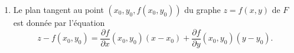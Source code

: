 {\begin{enumerate}
{\begin{enumerate}
\item Le plan tangent au point $(x_0,y_0,f(x_0,y_0))$
du graphe $z=f(x,y)$ de $F$ est donn\'ee par l'\'equation
\begin{equation}
z-f(x_0,y_0) =\frac{\partial f}{\partial x}(x_0,y_0)(x-x_0)+
\frac{\partial f}{\partial y}(x_0,y_0)(y-y_0) .
\label{eqt}
\end{equation}
\end{enumerate}}
\end{enumerate}
}
